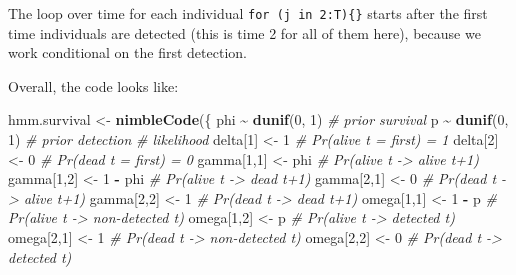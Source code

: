 \documentclass[
  12pt,
]{krantz}
\newenvironment{Shaded}{\begin{snugshade}}{\end{snugshade}}
\newcommand{\CommentTok}[1]{\textcolor[rgb]{0.56,0.35,0.01}{\textit{#1}}}
\newcommand{\DecValTok}[1]{\textcolor[rgb]{0.00,0.00,0.81}{#1}}
\newcommand{\FunctionTok}[1]{\textcolor[rgb]{0.13,0.29,0.53}{\textbf{#1}}}
\newcommand{\NormalTok}[1]{#1}
\newcommand{\OtherTok}[1]{\textcolor[rgb]{0.56,0.35,0.01}{#1}}
\newcommand{\SpecialCharTok}[1]{\textcolor[rgb]{0.81,0.36,0.00}{\textbf{#1}}}
\begin{document}
The loop over time for each individual \texttt{for\ (j\ in\ 2:T)\{\}} starts after the first time individuals are detected (this is time 2 for all of them here), because we work conditional on the first detection.

Overall, the code looks like:

\begin{Shaded}
\begin{Highlighting}[]
\NormalTok{hmm.survival }\OtherTok{\textless{}{-}} \FunctionTok{nimbleCode}\NormalTok{(\{}
\NormalTok{  phi }\SpecialCharTok{\textasciitilde{}} \FunctionTok{dunif}\NormalTok{(}\DecValTok{0}\NormalTok{, }\DecValTok{1}\NormalTok{) }\CommentTok{\# prior survival}
\NormalTok{  p }\SpecialCharTok{\textasciitilde{}} \FunctionTok{dunif}\NormalTok{(}\DecValTok{0}\NormalTok{, }\DecValTok{1}\NormalTok{) }\CommentTok{\# prior detection}
  \CommentTok{\# likelihood}
\NormalTok{  delta[}\DecValTok{1}\NormalTok{] }\OtherTok{\textless{}{-}} \DecValTok{1}          \CommentTok{\# Pr(alive t = first) = 1}
\NormalTok{  delta[}\DecValTok{2}\NormalTok{] }\OtherTok{\textless{}{-}} \DecValTok{0}          \CommentTok{\# Pr(dead t = first) = 0}
\NormalTok{  gamma[}\DecValTok{1}\NormalTok{,}\DecValTok{1}\NormalTok{] }\OtherTok{\textless{}{-}}\NormalTok{ phi      }\CommentTok{\# Pr(alive t {-}\textgreater{} alive t+1)}
\NormalTok{  gamma[}\DecValTok{1}\NormalTok{,}\DecValTok{2}\NormalTok{] }\OtherTok{\textless{}{-}} \DecValTok{1} \SpecialCharTok{{-}}\NormalTok{ phi  }\CommentTok{\# Pr(alive t {-}\textgreater{} dead t+1)}
\NormalTok{  gamma[}\DecValTok{2}\NormalTok{,}\DecValTok{1}\NormalTok{] }\OtherTok{\textless{}{-}} \DecValTok{0}        \CommentTok{\# Pr(dead t {-}\textgreater{} alive t+1)}
\NormalTok{  gamma[}\DecValTok{2}\NormalTok{,}\DecValTok{2}\NormalTok{] }\OtherTok{\textless{}{-}} \DecValTok{1}        \CommentTok{\# Pr(dead t {-}\textgreater{} dead t+1)}
\NormalTok{  omega[}\DecValTok{1}\NormalTok{,}\DecValTok{1}\NormalTok{] }\OtherTok{\textless{}{-}} \DecValTok{1} \SpecialCharTok{{-}}\NormalTok{ p    }\CommentTok{\# Pr(alive t {-}\textgreater{} non{-}detected t)}
\NormalTok{  omega[}\DecValTok{1}\NormalTok{,}\DecValTok{2}\NormalTok{] }\OtherTok{\textless{}{-}}\NormalTok{ p        }\CommentTok{\# Pr(alive t {-}\textgreater{} detected t)}
\NormalTok{  omega[}\DecValTok{2}\NormalTok{,}\DecValTok{1}\NormalTok{] }\OtherTok{\textless{}{-}} \DecValTok{1}        \CommentTok{\# Pr(dead t {-}\textgreater{} non{-}detected t)}
\NormalTok{  omega[}\DecValTok{2}\NormalTok{,}\DecValTok{2}\NormalTok{] }\OtherTok{\textless{}{-}} \DecValTok{0}        \CommentTok{\# Pr(dead t {-}\textgreater{} detected t)}

\end{Highlighting}
\end{Shaded}
\end{document}

